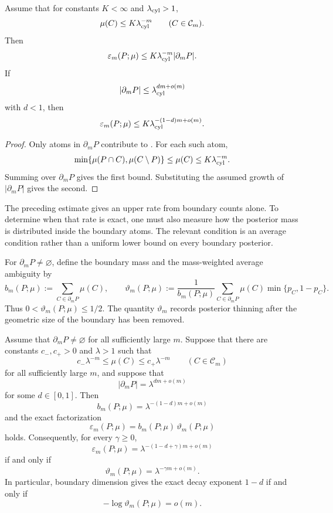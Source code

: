 \begin{theorem}
\label{thm:boundary-clarity}
Assume that for constants \(K<\infty\) and \(\lambda_{\rm cyl}>1\),
\[
\mu(C)\le K\lambda_{\rm cyl}^{-m}
\qquad(C\in\mathcal C_m).
\]
Then
\[
\varepsilon_m(P;\mu)\le K\lambda_{\rm cyl}^{-m}|\partial_mP|.
\]
If
\[
|\partial_mP|\le \lambda_{\rm cyl}^{dm+o(m)}
\]
with \(d<1\), then
\[
\varepsilon_m(P;\mu)
\le
K\lambda_{\rm cyl}^{-(1-d)m+o(m)}.
\]
\end{theorem}

\begin{proof}
Only atoms in \(\partial_mP\) contribute to .  For each such atom,
\[
\min\{\mu(P\cap C),\mu(C\setminus P)\}\le \mu(C)\le K\lambda_{\rm cyl}^{-m}.
\]
Summing over \(\partial_mP\) gives the first bound.  Substituting the assumed growth of \(|\partial_mP|\) gives the second.
\end{proof}

The preceding estimate gives an upper rate from boundary counts alone.  To
determine when that rate is exact, one must also measure how the posterior
mass is distributed inside the boundary atoms.  The relevant condition is
an average condition rather than a uniform lower bound on every boundary
posterior.

For \(\partial_mP\ne\varnothing\), define the boundary mass and the
mass-weighted average ambiguity by
\[
b_m(P;\mu):=\sum_{C\in\partial_mP}\mu(C),
\qquad
\vartheta_m(P;\mu):=
\frac{1}{b_m(P;\mu)}
\sum_{C\in\partial_mP}
\mu(C)\min\{p_C,1-p_C\}.
\]
Thus \(0<\vartheta_m(P;\mu)\le 1/2\).  The quantity
\(\vartheta_m\) records posterior thinning after the geometric size of the
boundary has been removed.

\begin{theorem}
\label{thm:average-boundary-thickness}
Assume that \(\partial_mP\ne\varnothing\) for all sufficiently large \(m\).
Suppose that there are constants \(c_-,c_+>0\) and \(\lambda>1\) such that
\[
c_-\lambda^{-m}\le \mu(C)\le c_+\lambda^{-m}
\qquad(C\in\mathcal C_m)
\]
for all sufficiently large \(m\), and suppose that
\[
|\partial_mP|=\lambda^{dm+o(m)}
\]
for some \(d\in[0,1]\).  Then
\[
b_m(P;\mu)=\lambda^{-(1-d)m+o(m)}
\]
and the exact factorization
\[
\boxed{
\varepsilon_m(P;\mu)=b_m(P;\mu)\,\vartheta_m(P;\mu)
}
\]
holds.  Consequently, for every \(\gamma\ge0\),
\[
\varepsilon_m(P;\mu)
=\lambda^{-(1-d+\gamma)m+o(m)}
\]
if and only if
\[
\vartheta_m(P;\mu)=\lambda^{-\gamma m+o(m)}.
\]
In particular, boundary dimension gives the exact decay exponent \(1-d\)
if and only if
\[
-\log\vartheta_m(P;\mu)=o(m).
\]
\end{theorem}

